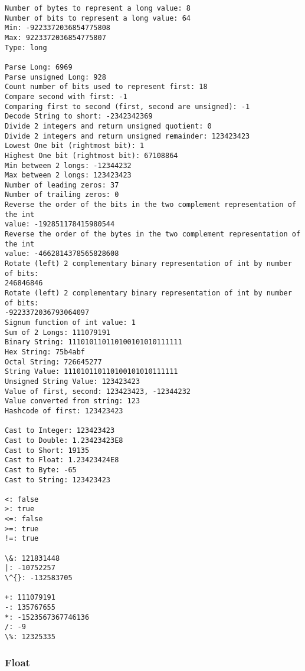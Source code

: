 \documentclass[11pt]{article}
\begin{document}
    \begin{Verbatim}[commandchars=\\\{\}]
Number of bytes to represent a long value: 8
Number of bits to represent a long value: 64
Min: -9223372036854775808
Max: 9223372036854775807
Type: long

Parse Long: 6969
Parse unsigned Long: 928
Count number of bits used to represent first: 18
Compare second with first: -1
Comparing first to second (first, second are unsigned): -1
Decode String to short: -2342342369
Divide 2 integers and return unsigned quotient: 0
Divide 2 integers and return unsigned remainder: 123423423
Lowest One bit (rightmost bit): 1
Highest One bit (rightmost bit): 67108864
Min between 2 longs: -12344232
Max between 2 longs: 123423423
Number of leading zeros: 37
Number of trailing zeros: 0
Reverse the order of the bits in the two complement representation of the int
value: -192851178415980544
Reverse the order of the bytes in the two complement representation of the int
value: -4662814378565828608
Rotate (left) 2 complementary binary representation of int by number of bits:
246846846
Rotate (left) 2 complementary binary representation of int by number of bits:
-9223372036793064097
Signum function of int value: 1
Sum of 2 Longs: 111079191
Binary String: 111010110110100101010111111
Hex String: 75b4abf
Octal String: 726645277
String Value: 111010110110100101010111111
Unsigned String Value: 123423423
Value of first, second: 123423423, -12344232
Value converted from string: 123
Hashcode of first: 123423423

Cast to Integer: 123423423
Cast to Double: 1.23423423E8
Cast to Short: 19135
Cast to Float: 1.23423424E8
Cast to Byte: -65
Cast to String: 123423423

<: false
>: true
<=: false
>=: true
!=: true

\&: 121831448
|: -10752257
\^{}: -132583705

+: 111079191
-: 135767655
*: -1523567367746136
/: -9
\%: 12325335
    \end{Verbatim}

    \hypertarget{float}{%
\subsubsection{Float}\label{float}}
\end{document}
